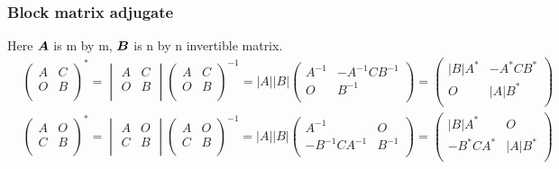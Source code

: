 \documentclass{overview}
\begin{document}
\subsubsection{Block matrix adjugate}

Here $\boldsymbol{A}$ is m by m, $\boldsymbol{B}$ is n by n invertible matrix.
\[
\begin{aligned}
	&
	\begin{pmatrix} A & C \\
		O & B \\ \end{pmatrix}^{*}
	=
	\begin{vmatrix} A & C \\
		O & B \\ \end{vmatrix}
	\begin{pmatrix} A & C \\
	O & B \\ \end{pmatrix}^{-1}
	=|A||B|
	\begin{pmatrix} A^{-1} & -A^{-1}CB^{-1} \\
		O & B^{-1} \\ \end{pmatrix}
	=\begin{pmatrix}
		|B|A^{*} & -A^{*}C B^{*} \\
		O & |A|B^{*} \\
	\end{pmatrix} \\
  &
		\begin{pmatrix} A & O \\
		C & B \\ \end{pmatrix}^{*}
	=
	\begin{vmatrix} A & O \\
		C & B \\ \end{vmatrix}
	\begin{pmatrix} A & O \\
	C & B \\ \end{pmatrix}^{-1}
	=|A||B|
	\begin{pmatrix} A^{-1} & O \\
		-B^{-1}CA^{-1} & B^{-1} \\ \end{pmatrix}
	=\begin{pmatrix}
		|B|A^{*} & O \\
		-B^{*}C A^{*} & |A|B^{*} \\
	\end{pmatrix}
\end{aligned}
\] 
\end{document}
